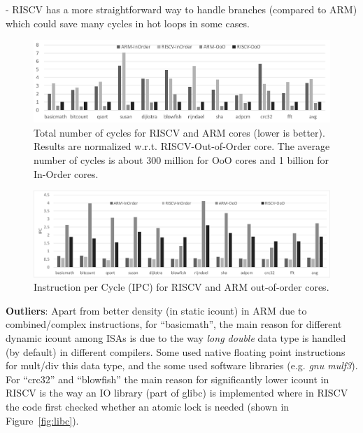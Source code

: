 - RISCV has a more straightforward way to handle branches (compared to ARM) which could save many cycles in hot loops in some cases. 


\begin{figure}[htb]
	\centering
	\includegraphics[width=1.9\columnwidth]{figures/cyc.pdf}
	\caption{Total number of cycles for RISCV and ARM cores (lower is better). Results are normalized w.r.t. RISCV-Out-of-Order core. The average number of cycles is about 300 million for OoO cores and 1 billion for In-Order cores.}
	\label{fig:totCyc}
\end{figure} 

\begin{figure}[]
	\centering
	\includegraphics[width=1.8\columnwidth]{figures/ipc.pdf}
	\caption{Instruction per Cycle (IPC) for RISCV and ARM out-of-order cores.}
	\label{fig:ipc}
	\vspace{-1em}
\end{figure} 





\noindent \textbf{Outliers}: Apart from better density (in static icount) in ARM due to combined/complex instructions, for ``basicmath'', the main reason for different dynamic icount among ISAs is due to the way \textit{long double} data type is handled (by default) in different compilers. Some used native floating point instructions for mult/div this data type, and the some used software libraries (e.g. \textit{gnu mulf3}). For ``crc32'' and ``blowfish'' the main reason for significantly lower icount in RISCV is the way an IO library (part of glibc) is implemented where in RISCV the code first checked whether an atomic lock is needed (shown in Figure~\ref{fig:libc}). 


